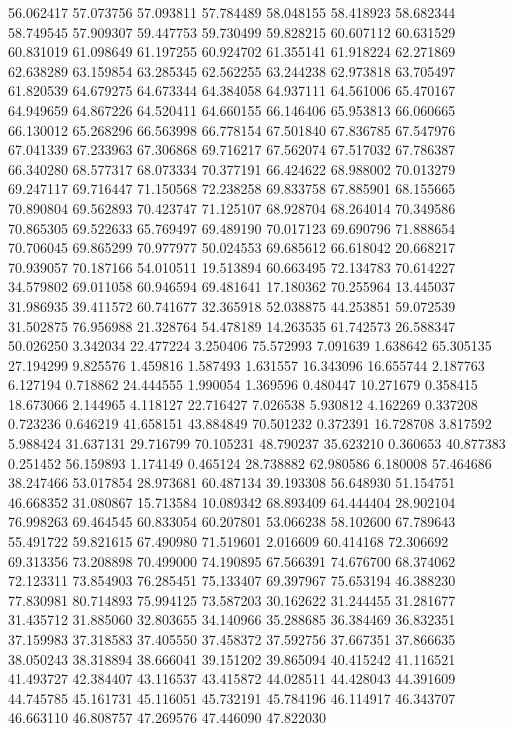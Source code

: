 56.062417
57.073756
57.093811
57.784489
58.048155
58.418923
58.682344
58.749545
57.909307
59.447753
59.730499
59.828215
60.607112
60.631529
60.831019
61.098649
61.197255
60.924702
61.355141
61.918224
62.271869
62.638289
63.159854
63.285345
62.562255
63.244238
62.973818
63.705497
61.820539
64.679275
64.673344
64.384058
64.937111
64.561006
65.470167
64.949659
64.867226
64.520411
64.660155
66.146406
65.953813
66.060665
66.130012
65.268296
66.563998
66.778154
67.501840
67.836785
67.547976
67.041339
67.233963
67.306868
69.716217
67.562074
67.517032
67.786387
66.340280
68.577317
68.073334
70.377191
66.424622
68.988002
70.013279
69.247117
69.716447
71.150568
72.238258
69.833758
67.885901
68.155665
70.890804
69.562893
70.423747
71.125107
68.928704
68.264014
70.349586
70.865305
69.522633
65.769497
69.489190
70.017123
69.690796
71.888654
70.706045
69.865299
70.977977
50.024553
69.685612
66.618042
20.668217
70.939057
70.187166
54.010511
19.513894
60.663495
72.134783
70.614227
34.579802
69.011058
60.946594
69.481641
17.180362
70.255964
13.445037
31.986935
39.411572
60.741677
32.365918
52.038875
44.253851
59.072539
31.502875
76.956988
21.328764
54.478189
14.263535
61.742573
26.588347
50.026250
3.342034
22.477224
3.250406
75.572993
7.091639
1.638642
65.305135
27.194299
9.825576
1.459816
1.587493
1.631557
16.343096
16.655744
2.187763
6.127194
0.718862
24.444555
1.990054
1.369596
0.480447
10.271679
0.358415
18.673066
2.144965
4.118127
22.716427
7.026538
5.930812
4.162269
0.337208
0.723236
0.646219
41.658151
43.884849
70.501232
0.372391
16.728708
3.817592
5.988424
31.637131
29.716799
70.105231
48.790237
35.623210
0.360653
40.877383
0.251452
56.159893
1.174149
0.465124
28.738882
62.980586
6.180008
57.464686
38.247466
53.017854
28.973681
60.487134
39.193308
56.648930
51.154751
46.668352
31.080867
15.713584
10.089342
68.893409
64.444404
28.902104
76.998263
69.464545
60.833054
60.207801
53.066238
58.102600
67.789643
55.491722
59.821615
67.490980
71.519601
2.016609
60.414168
72.306692
69.313356
73.208898
70.499000
74.190895
67.566391
74.676700
68.374062
72.123311
73.854903
76.285451
75.133407
69.397967
75.653194
46.388230
77.830981
80.714893
75.994125
73.587203
30.162622
31.244455
31.281677
31.435712
31.885060
32.803655
34.140966
35.288685
36.384469
36.832351
37.159983
37.318583
37.405550
37.458372
37.592756
37.667351
37.866635
38.050243
38.318894
38.666041
39.151202
39.865094
40.415242
41.116521
41.493727
42.384407
43.116537
43.415872
44.028511
44.428043
44.391609
44.745785
45.161731
45.116051
45.732191
45.784196
46.114917
46.343707
46.663110
46.808757
47.269576
47.446090
47.822030
